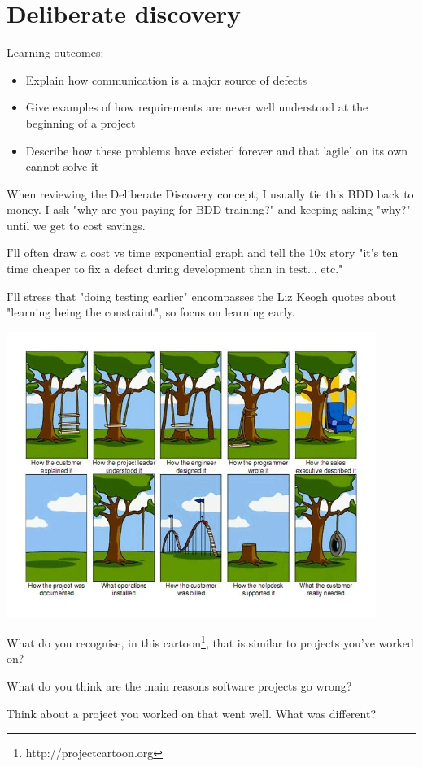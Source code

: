 \chapter*{Deliberate discovery}

\ifnotes
    Learning outcomes:
    
    \begin{itemize}
        \item Explain how communication is a major source of defects
        \item Give examples of how requirements are never well understood at the beginning of a project
        \item Describe how these problems have existed forever and that 'agile' on its own cannot solve it
    \end{itemize}
    
    When reviewing the Deliberate Discovery concept, I usually tie this BDD back to money. I ask "why are you paying for BDD training?" and keeping asking "why?" until we get to cost savings. 
    
    I'll often draw a cost vs time exponential graph and tell the 10x story "it's ten time cheaper to fix a defect during development than in test... etc."
    
    I'll stress that "doing testing earlier" encompasses the Liz Keogh quotes about "learning being the constraint", so focus on learning early.
\fi

\ifcontent
    \includegraphics[width=0.9\textwidth, keepaspectratio]{images/project-cartoon}
    
    
    What do you recognise, in this cartoon\footnote{http://projectcartoon.org}, that is similar to projects you've worked on?
    
    
    What do you think are the main reasons software projects go wrong?
    
    
    Think about a project you worked on that went well. What was different?
    
\fi